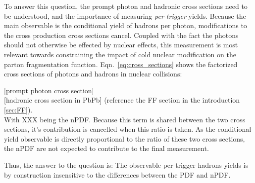 To answer this question, the prompt photon and hadronic cross sections need to be understood, and the importance of measuring  \textit{per-trigger} yields. Because the main observable is the conditional yield of hadrons per photon, modifications to the cross production cross sections cancel. Coupled with the fact the photons should not otherwise be effected by nuclear effects, this measurement is most relevant towards constraining the impact of cold nuclear modification on the parton fragmentation function. Eqn.~\ref{eq:cross_sections} shows the factorized cross sections of photons and hadrons in nuclear collisions:

[prompt photon cross section]\\

[hadronic cross section in PbPb] (reference the FF section in the introduction \ref{sec:FF}).\\

With XXX being the nPDF. Because this term is shared between the two cross sections, it's contribution is cancelled when this ratio is taken. As the conditional yield observable is directly proportional to the ratio of these two cross sections, the nPDF are not expected to contribute to the final measurement.

Thus, the answer to the question is: The observable per-trigger hadrons yields is by construction insensitive to the differences between the PDF and nPDF.

